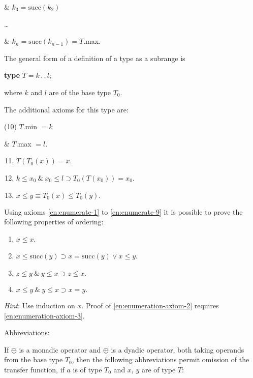 \tabto*{1.8em}\& $k_3 = \text{succ}(k_2)$

\tabto*{3.8em}\dots

\tabto*{1.8em}\& $k_n = \text{succ}(k_{n-1}) = T$.max.

The general form of a definition of a type as a subrange is

\quad \textbf{type} $T=k\,.\,.\,l;$

\noindent
where $k$ and $l$ are of the base type $T_0$.

The additional axioms for this type are:

\tabto*{.9em}(10) $T$.min $= k$

\tabto*{1.8em}\& $T$.max $= l$.

\begin{enumerate}[leftmargin=2\parindent, label=(\arabic*)]
	\setcounter{enumi}{10}
	\item $T(T_0(x)) = x$.

	\item $k \leqslant x_0\ \&\ x_0 \leqslant l \supset T_0(T(x_0)) = x_0$.

	\item $x \leqslant y \equiv T_0(x) \leqslant T_0(y).$
\end{enumerate}

Using axioms \ref{en:enumerate-1} to \ref{en:enumerate-9} it is possible to prove the following properties of ordering:

\begin{enumerate}[leftmargin=2\parindent, label=(T\arabic*)]
	\item $x \leqslant x$.

	\item \label{en:enumeration-axiom-2}
	$x \leqslant \text{succ}(y) \supset x = \text{succ}(y) \vee x \leqslant y$.
	
	\item \label{en:enumeration-axiom-3}
	$z \leqslant y\ \&\ y \leqslant x \supset z \leqslant x.$
	
	\item $x \leqslant y\ \&\ y \leqslant x \supset x = y.$
\end{enumerate}

\noindent
\textit{Hint}: Use induction on $x$. Proof of \ref{en:enumeration-axiom-2} requires \ref{en:enumeration-axiom-3}.

\noindent
Abbreviations:

\noindent
If $\ominus$ is a monadic operator and $\oplus$ is a dyadic operator, both taking operands from the base type $T_0$, then the following abbreviations permit omission of the transfer function, if $a$ is of type $T_0$ and $x$, $y$ are of type $T$:

